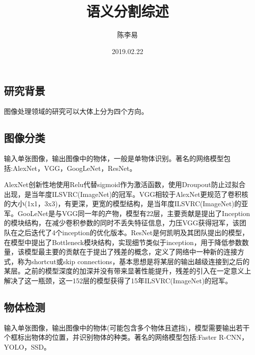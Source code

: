\documentclass{article}
\begin{document}
\nocite{*}
\begin{CJK}{UTF8}{gbsn}
\title{语义分割综述}
\author{陈李易}
\date{2019.02.22}
\maketitle

\newpage
\tableofcontents
\newpage

\section{研究背景}
图像处理领域的研究可以大体上分为四个方向。

\subsection{图像分类}
输入单张图像，输出图像中的物体，一般是单物体识别。著名的网络模型包括:AlexNet\cite{krizhevsky2012imagenet}，VGG\cite{simonyan2014very}，GoogLeNet\cite{szegedy2015going}，ResNet\cite{he2016deep}。

AlexNet\cite{krizhevsky2012imagenet}创新性地使用Relu代替sigmoid作为激活函数，使用Droupout防止过拟合出现，是当年度ILSVRC(ImageNet)的冠军。VGG\cite{simonyan2014very}相较于AlexNet\cite{krizhevsky2012imagenet}更规范了卷积核的大小(1x1，3x3)，有更深，更宽的模型结构，是当年度ILSVRC(ImageNet)的亚军。GooLeNet\cite{szegedy2015going}是与VGG\cite{simonyan2014very}同一年的产物，模型有22层，主要贡献是提出了Inception的模块结构，在减少卷积参数的同时不丢失特征信息，力压VGG\cite{simonyan2014very}获得冠军，该团队在之后迭代了4个inception的优化版本\cite{szegedy2016rethinking,szegedy2017inception}。ResNet\cite{he2016deep}是何凯明及其团队提出的模型，在模型中提出了Bottleneck模块结构，实现细节类似于inception，用于降低参数数量，该模型最主要的贡献在于提出了残差的概念，定义了网络中一种新的连接方式，称为shortcut或skip connections，基本思想是将某层的输出越级连接到之后的某层。之前的模型深度的加深并没有带来显著性能提升，残差的引入在一定意义上解决了这一瓶颈，这一152层的模型获得了15年ILSVRC(ImageNet)的冠军。

\subsection{物体检测}
输入单张图像，输出图像中的物体(可能包含多个物体且遮挡)，模型需要输出若干个框标出物体的位置，并识别物体的种类。著名的网络模型包括:Faster R-CNN\cite{ren2015faster}，YOLO\cite{redmon2016you,redmon2017yolo9000,redmon2018yolov3}，SSD\cite{liu2016ssd}。


\end{CJK}
\end{document}
